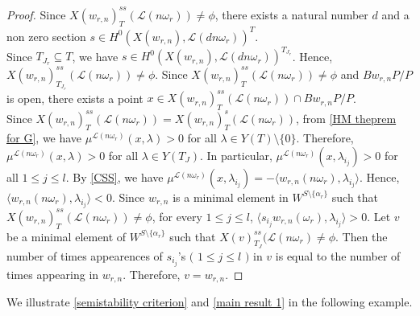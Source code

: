 \documentclass[12pt,reqno]{amsart}
\numberwithin{equation}{section}
\theoremstyle{definition}
\begin{document}
\begin{proof}
	Since $X(w_{r,n})^{ss}_{T}(\mathcal{L}(n\omega_{r}))\neq \phi$, there exists a natural number $d$ and a non zero section $s\in H^{0}(X(w_{r,n}),\mathcal{L}(dn\omega_{r}))^{T}$.\\ Since $T_{J_{r}}\subseteq T$, we have $s\in 	H^{0}(X(w_{r,n}),\mathcal{L}(dn\omega_{r}))^{T_{J_{r}}}$. Hence, $X(w_{r,n})^{ss}_{T_{J_{r}}}(\mathcal{L}(n\omega_{r}))\neq \phi$.
	Since $X(w_{r,n})^{ss}_{T}(\mathcal{L}(n\omega_{r}))\neq \phi$ and $Bw_{r,n}P/P$ is open, there exists a point $x\in X(w_{r,n})^{ss}_{T}(\mathcal{L}(n\omega_{r}))\cap Bw_{r,n}P/P$.\\ Since $X(w_{r,n})^{ss}_{T}(\mathcal{L}(n\omega_{r}))=X(w_{r,n})^{s}_{T}(\mathcal{L}(n\omega_{r}))$, from \cref{HM theprem for G}, we have  $\mu^{\mathcal{L}(n\omega_{r})}(x,\lambda)>0$ for all $\lambda\in Y(T)\setminus\{0\}$. Therefore, $\mu^{\mathcal{L}(n\omega_{r})}(x,\lambda)>0$ for all $\lambda\in Y(T_{J})$. In particular, $\mu^{\mathcal{L}(n\omega_{r})}(x,\lambda_{i_{j}})>0$ for all $1\leq j\leq l$. By \cref{CSS}, we have $\mu^{\mathcal{L}(n\omega_{r})}(x,\lambda_{i_{j}})=-\langle w_{r,n}(n\omega_{r}),\lambda_{i_{j}}\rangle$. Hence, $\langle w_{r,n}(n\omega_{r}),\lambda_{i_{j}}\rangle<0$. Since $w_{r,n}$ is a minimal element in $W^{S\setminus\{\alpha_{r}\}}$ such that $X(w_{r,n})^{ss}_{T}(\mathcal{L}(n\omega_{r}))\neq \phi$, for every $1\leq j\leq l$, $\langle s_{i_{j}}w_{r,n}(\omega_{r}),\lambda_{i_{j}}\rangle>0$. Let $v$ be a minimal element of $W^{S\setminus\{\alpha_{r}\}}$ such that $X(v)^{ss}_{T_{J}}(\mathcal{L}(n\omega_{r})\neq\phi$. Then the number of times appearences of $s_{i_{j}}$'s $($ $1\leq j\leq l$ $)$ in $v$ is equal to the number of times appearing in $w_{r,n}$. Therefore, $v=w_{r,n}$.
\end{proof}
We illustrate \cref{semistability criterion} and \cref{main result 1} in the following example.
\end{document}
